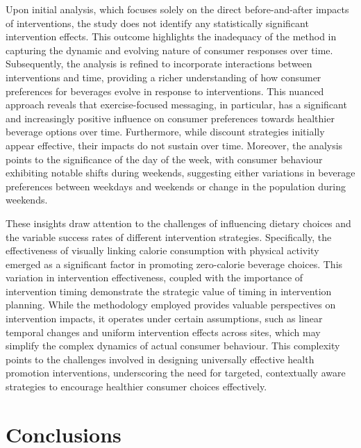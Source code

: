 \documentclass[
]{article}
\begin{document}
Upon initial analysis, which focuses solely on the direct before-and-after impacts of interventions, the study does not identify any statistically significant intervention effects. This outcome highlights the inadequacy of the method in capturing the dynamic and evolving nature of consumer responses over time. Subsequently, the analysis is refined to incorporate interactions between interventions and time, providing a richer understanding of how consumer preferences for beverages evolve in response to interventions. This nuanced approach reveals that exercise-focused messaging, in particular, has a significant and increasingly positive influence on consumer preferences towards healthier beverage options over time. Furthermore, while discount strategies initially appear effective, their impacts do not sustain over time. Moreover, the analysis points to the significance of the day of the week, with consumer behaviour exhibiting notable shifts during weekends, suggesting either variations in beverage preferences between weekdays and weekends or change in the population during weekends.

These insights draw attention to the challenges of influencing dietary choices and the variable success rates of different intervention strategies. Specifically, the effectiveness of visually linking calorie consumption with physical activity emerged as a significant factor in promoting zero-calorie beverage choices. This variation in intervention effectiveness, coupled with the importance of intervention timing demonstrate the strategic value of timing in intervention planning. While the methodology employed provides valuable perspectives on intervention impacts, it operates under certain assumptions, such as linear temporal changes and uniform intervention effects across sites, which may simplify the complex dynamics of actual consumer behaviour. This complexity points to the challenges involved in designing universally effective health promotion interventions, underscoring the need for targeted, contextually aware strategies to encourage healthier consumer choices effectively.

\hypertarget{conclusions}{%
\section{Conclusions}\label{conclusions}}
\end{document}
